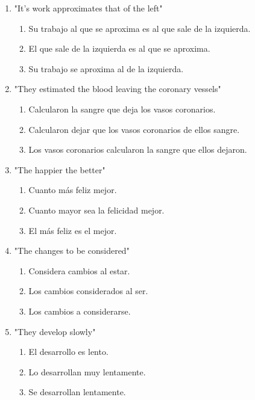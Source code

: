 \documentclass[11pt,a4paper]{article}
\begin{document}
\begin{enumerate}
    \item "It's work approximates that of the left"
    \begin{enumerate}[label=\alph*.]
        \item Su trabajo al que se aproxima es al que sale de la izquierda.
        \item El que sale de la izquierda es al que se aproxima.
        \item Su trabajo se aproxima al de la izquierda.
    \end{enumerate}

    \item "They estimated the blood leaving the coronary vessels"
    \begin{enumerate}[label=\alph*.]
        \item Calcularon la sangre que deja los vasos coronarios.
        \item Calcularon dejar que los vasos coronarios de ellos sangre.
        \item Los vasos coronarios calcularon la sangre que ellos dejaron.
    \end{enumerate}

    \item "The happier the better"
    \begin{enumerate}[label=\alph*.]
        \item Cuanto más feliz mejor.
        \item Cuanto mayor sea la felicidad mejor.
        \item El más feliz es el mejor.
    \end{enumerate}

    \item "The changes to be considered"
    \begin{enumerate}[label=\alph*.]
        \item Considera cambios al estar.
        \item Los cambios considerados al ser.
        \item Los cambios a considerarse.
    \end{enumerate}

    \item "They develop slowly"
    \begin{enumerate}[label=\alph*.]
        \item El desarrollo es lento.
        \item Lo desarrollan muy lentamente.
        \item Se desarrollan lentamente.
    \end{enumerate}
\end{enumerate}
\end{document}
